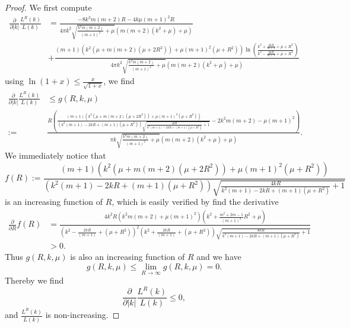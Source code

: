\documentclass[a4paper,11pt]{article}
\newcommand{\abs}[1]{\left\lvert #1 \right\rvert}
\numberwithin{equation}{section}
\begin{document}
\begin{proof}
	We first compute \begin{equation}
	\begin{aligned}
	\frac{\partial}{\partial \abs{k}}\frac{L^R(k)}{L(k)}&=\frac{-8 k^3 m (m+2) R-4 k \mu  (m+1)^2 R}{4 \pi  k^2 \sqrt{\frac{k^2 m (m+2)}{(m+1)^2}+\mu } \left(m (m+2) \left(k^2+\mu \right)+\mu \right)}\\&+\frac{(m+1) \left(k^2 \left(\mu +m (m+2) \left(\mu +2 R^2\right)\right)+\mu  (m+1)^2 \left(\mu +R^2\right)\right) \ln \left(\frac{k^2+\frac{2 k R}{m+1}+\mu +R^2}{k^2-\frac{2 k R}{m+1}+\mu +R^2}\right)}{4 \pi  k^2 \sqrt{\frac{k^2 m (m+2)}{(m+1)^2}+\mu } \left(m (m+2) \left(k^2+\mu \right)+\mu \right)}
		\end{aligned}
	\end{equation}
	using $ \ln(1+x)\leq\frac{x}{\sqrt{1+x}} $, we find \begin{equation}
	\begin{aligned}
	\frac{\partial}{\partial \abs{k}}\frac{L^R(k)}{L(k)}&\leq g(R,k,\mu)\\
	:=&\frac{R \left(\frac{(m+1) \left(k^2 \left(\mu +m (m+2) \left(\mu +2 R^2\right)\right)+\mu  (m+1)^2 \left(\mu +R^2\right)\right)}{\left(k^2 (m+1)-2 k R+(m+1) \left(\mu +R^2\right)\right) \sqrt{\frac{4 k
					R}{k^2 (m+1)-2 k R+(m+1) \left(\mu +R^2\right)}+1}}-2 k^2 m (m+2)-\mu  (m+1)^2\right)}{\pi  k \sqrt{\frac{k^2 m (m+2)}{(m+1)^2}+\mu } \left(m (m+2) \left(k^2+\mu \right)+\mu \right)}.
	\end{aligned}
	\end{equation}
	We immediately notice that \begin{equation}
	f(R):=\frac{(m+1) \left(k^2 \left(\mu +m (m+2) \left(\mu +2 R^2\right)\right)+\mu  (m+1)^2 \left(\mu +R^2\right)\right)}{\left(k^2 (m+1)-2 k R+(m+1) \left(\mu +R^2\right)\right) \sqrt{\frac{4 k
				R}{k^2 (m+1)-2 k R+(m+1) \left(\mu +R^2\right)}+1}}
	\end{equation}
	is an increasing function of $ R $, which is easily verified by find the derivative\begin{equation}
	\begin{aligned}
	\frac{\partial}{\partial R}f(R)&=\frac{4 k^2  R \left(k^2 m (m+2)+\mu  (m+1)^2\right) \left(k^2 +\frac{m^2+2 m-1}{(m+1)^2} R^2+\mu  \right)}{\left(k^2 -\frac{2 k R}{(m+1)}+ \left(\mu +R^2\right)\right)^2 \left(k^2+\frac{2 k
		R}{(m+1)}+ \left(\mu +R^2\right)\right) \sqrt{\frac{4 k R}{k^2 (m+1)-2 k R+(m+1) \left(\mu +R^2\right)}+1}}\\
   &> 0.
	\end{aligned}
	\end{equation}
	Thus $ g(R,k,\mu) $ is also an increasing function of $ R $ and we have \begin{equation}
	g(R,k,\mu)\leq \lim\limits_{R\to\infty}g(R,k,\mu)=0.
	\end{equation} 
	Thereby we find \begin{equation}
	\frac{\partial}{\partial \abs{k}}\frac{L^R(k)}{L(k)}\leq 0,
	\end{equation}
	and $ \frac{L^R(k)}{L(k)} $ is non-increasing.
\end{proof}


\end{document}
